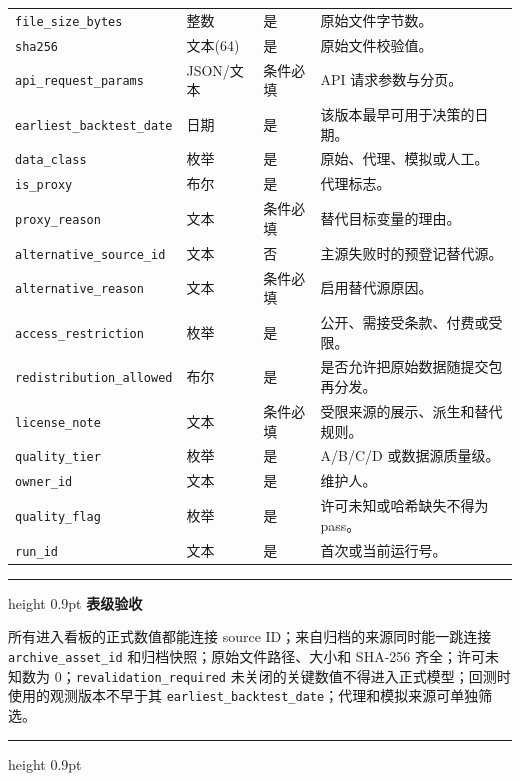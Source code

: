 \documentclass[UTF8,fontset=windows,12pt,openany]{ctexbook}
\newenvironment{gatebox}[1][]{%
  \par\medskip\noindent\begin{center}\begin{minipage}{0.93\textwidth}%
  \color{GoldLine}\hrule height 0.9pt\vspace{0.45em}%
  \textbf{#1}\par\smallskip\color{black}%
}{%
  \par\vspace{0.35em}\color{GoldLine}\hrule height 0.9pt%
  \end{minipage}\end{center}\medskip%
}
\newcommand{\Field}[1]{{\small\nolinkurl{#1}}}
\begin{document}
\begin{longtable}{p{3.7cm}p{2.3cm}p{2.1cm}p{5.1cm}}
\Field{file_size_bytes} & 整数 & 是 & 原始文件字节数。\\
\Field{sha256} & 文本(64) & 是 & 原始文件校验值。\\
\Field{api_request_params} & JSON/文本 & 条件必填 & API 请求参数与分页。\\
\Field{earliest_backtest_date} & 日期 & 是 & 该版本最早可用于决策的日期。\\
\Field{data_class} & 枚举 & 是 & 原始、代理、模拟或人工。\\
\Field{is_proxy} & 布尔 & 是 & 代理标志。\\
\Field{proxy_reason} & 文本 & 条件必填 & 替代目标变量的理由。\\
\Field{alternative_source_id} & 文本 & 否 & 主源失败时的预登记替代源。\\
\Field{alternative_reason} & 文本 & 条件必填 & 启用替代源原因。\\
\Field{access_restriction} & 枚举 & 是 & 公开、需接受条款、付费或受限。\\
\Field{redistribution_allowed} & 布尔 & 是 & 是否允许把原始数据随提交包再分发。\\
\Field{license_note} & 文本 & 条件必填 & 受限来源的展示、派生和替代规则。\\
\Field{quality_tier} & 枚举 & 是 & A/B/C/D 或数据源质量级。\\
\Field{owner_id} & 文本 & 是 & 维护人。\\
\Field{quality_flag} & 枚举 & 是 & 许可未知或哈希缺失不得为 pass。\\
\Field{run_id} & 文本 & 是 & 首次或当前运行号。\\
\bottomrule
\end{longtable}

\begin{gatebox}[表级验收]
所有进入看板的正式数值都能连接 source ID；来自归档的来源同时能一跳连接 \Field{archive_asset_id} 和归档快照；原始文件路径、大小和 SHA-256 齐全；许可未知数为 0；\Field{revalidation_required} 未关闭的关键数值不得进入正式模型；回测时使用的观测版本不早于其 \Field{earliest_backtest_date}；代理和模拟来源可单独筛选。
\end{gatebox}
\end{document}
